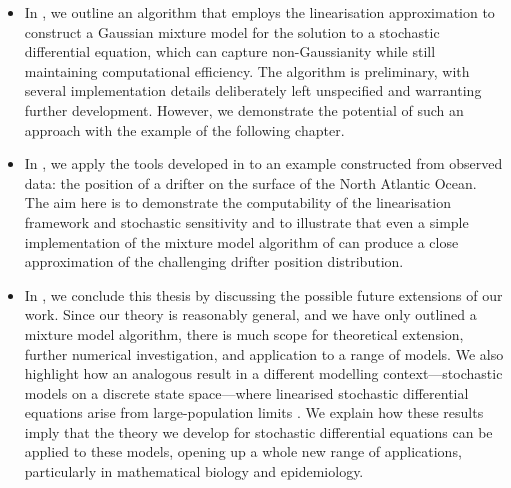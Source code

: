 \begin{itemize}
	\item In , we outline an algorithm that employs the linearisation approximation to construct a Gaussian mixture model for the solution to a stochastic differential equation, which can capture non-Gaussianity while still maintaining computational efficiency.
	      The algorithm is preliminary, with several implementation details deliberately left unspecified and warranting further development.
	      However, we demonstrate the potential of such an approach with the example of the following chapter.

	\item In , we apply the tools developed in  to an example constructed from observed data: the position of a drifter on the surface of the North Atlantic Ocean.
	      The aim here is to demonstrate the computability of the linearisation framework and stochastic sensitivity and to illustrate that even a simple implementation of the mixture model algorithm of  can produce a close approximation of the challenging drifter position distribution.

	\item In , we conclude this thesis by discussing the possible future extensions of our work.
	      Since our theory is reasonably general, and we have only outlined a mixture model algorithm, there is much scope for theoretical extension, further numerical investigation, and application to a range of models.
	      We also highlight how an analogous result in a different modelling context---stochastic models on a discrete state space---where linearised stochastic differential equations arise from large-population limits \citep{Kurtz_1970_SolutionsOrdinaryDifferential,Kurtz_1971_LimitTheoremsSequences}.
	      We explain how these results imply that the theory we develop for stochastic differential equations can be applied to these models, opening up a whole new range of applications, particularly in mathematical biology and epidemiology.


\end{itemize}





